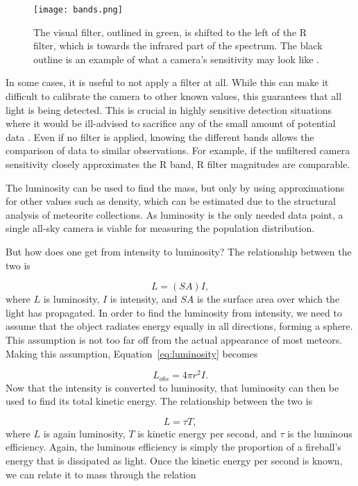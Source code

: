 \begin{figure}[ht!]
	\centering
	\texttt{[image: bands.png]}
	\caption{The visual filter, outlined in green, is shifted to the left of the R filter, which is towards the infrared part of the spectrum. The black outline is an example of what a camera's sensitivity may look like \protect\cite{Suggs2017}.}
	\label{fig:bands}
\end{figure}

In some cases, it is useful to not apply a filter at all. While this can make it difficult to calibrate the camera to other known values, this guarantees that all light is being detected. This is crucial in highly sensitive detection situations where it would be ill-advised to sacrifice any of the small amount of potential data \cite{Rembold2015}. Even if no filter is applied, knowing the different bands allows the comparison of data to similar observations. For example, if the unfiltered camera sensitivity closely approximates the R band, R filter magnitudes are comparable.

The luminosity can be used to find the mass, but only by using approximations for other values such as density, which can be estimated due to the structural analysis of meteorite collections. As luminosity is the only needed data point, a single all-sky camera is viable for measuring the population distribution.

But how does one get from intensity to luminosity? The relationship between the two is

\begin{equation}
	L = (SA)I,
	\label{eq:luminosity}
\end{equation}
where $L$ is luminosity, $I$ is intensity, and $SA$ is the surface area over which the light has propagated. In order to find the luminosity from intensity, we need to assume that the object radiates energy equally in all directions, forming a sphere. This assumption is not too far off from the actual appearance of most meteors. Making this assumption, Equation~\ref{eq:luminosity} becomes 

\begin{equation}
	L_{obs} = 4 \pi r^2 I.
\end{equation}
Now that the intensity is converted to luminosity, that luminosity can then be used to find its total kinetic energy. The relationship between the two is

\begin{equation}
	L = \tau T,
	\label{eq:kinetic}
\end{equation}
where $L$ is again luminosity, $T$ is kinetic energy per second, and $\tau$ is the luminous efficiency. Again, the luminous efficiency is simply the proportion of a fireball's energy that is dissipated as light. Once the kinetic energy per second is known, we can relate it to mass through the relation

